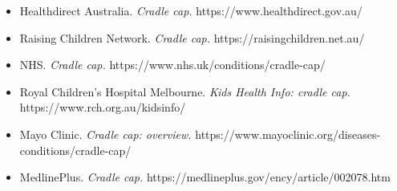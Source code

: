 \begin{itemize}
    \item Healthdirect Australia. \textit{Cradle cap.} https://www.healthdirect.gov.au/
    \item Raising Children Network. \textit{Cradle cap.} https://raisingchildren.net.au/
    \item NHS. \textit{Cradle cap.} https://www.nhs.uk/conditions/cradle-cap/
    \item Royal Children's Hospital Melbourne. \textit{Kids Health Info: cradle cap.} https://www.rch.org.au/kidsinfo/
    \item Mayo Clinic. \textit{Cradle cap: overview.} https://www.mayoclinic.org/diseases-conditions/cradle-cap/
    \item MedlinePlus. \textit{Cradle cap.} https://medlineplus.gov/ency/article/002078.htm
\end{itemize}
